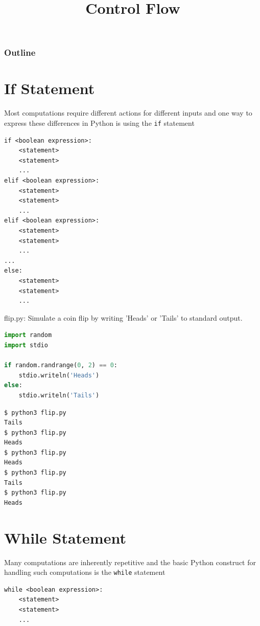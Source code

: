 \documentclass[8pt,a4paper,compress]{beamer}
\title{Control Flow}
\date{}
\begin{document}
\begin{frame}
\vfill
\titlepage
\end{frame}

\begin{frame}
\frametitle{Outline}
\tableofcontents
\end{frame}

\section{If Statement}
\begin{frame}[fragile]
\pause

Most computations require different actions for different inputs and one way to express these differences in Python is using the \lstinline{if} statement

\pause
\smallskip

\begin{lstlisting}[language={}]
if <boolean expression>:
    <statement>
    <statement>
    ...
elif <boolean expression>:
    <statement>
    <statement>
    ...
elif <boolean expression>:
    <statement>
    <statement>
    ...
...
else: 
    <statement>
    <statement>
    ...
\end{lstlisting}
\end{frame}

\begin{frame}[fragile]
\pause

\begin{framed}
\tiny flip.py: Simulate a coin flip by writing 'Heads' or 'Tails' to standard output.
\end{framed}

\begin{lstlisting}[language=Python]
import random
import stdio

if random.randrange(0, 2) == 0:
    stdio.writeln('Heads')
else:
    stdio.writeln('Tails')
\end{lstlisting}

\pause

\begin{lstlisting}[language={}]
$ python3 flip.py 
Tails
$ python3 flip.py 
Heads
$ python3 flip.py 
Heads
$ python3 flip.py 
Tails
$ python3 flip.py 
Heads
\end{lstlisting}
\end{frame}

\section{While Statement}
\begin{frame}[fragile]
\pause

Many computations are inherently repetitive and the basic Python construct for handling such computations is the \lstinline{while} statement

\pause
\smallskip

\begin{lstlisting}[language={}]
while <boolean expression>:
    <statement>
    <statement>
    ...
\end{lstlisting}
\end{frame}
\end{document}
